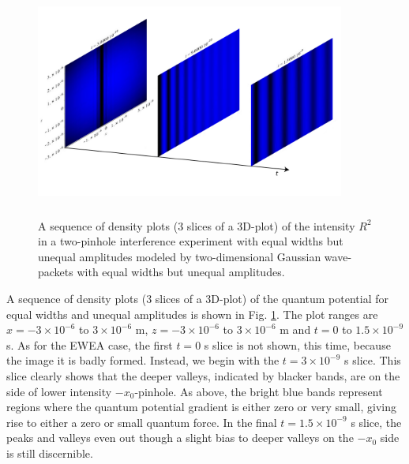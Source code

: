\documentclass[12pt]{article}       %
\begin{document}

\begin{figure}[h]
\unitlength=1in 
\hspace*{1.0in}\includegraphics[width=4in,height=3in]  {figure14.jpg} 
\caption{A sequence of density plots (3 slices of a 3D-plot) of the intensity $R^2$ in a two-pinhole interference experiment with  equal widths but unequal amplitudes modeled by two-dimensional Gaussian wave-packets with equal widths but unequal amplitudes.\label{T2DGQPDPUA}}
\end{figure}
A sequence of density plots (3 slices of a 3D-plot) of the quantum potential  for equal widths and unequal amplitudes is shown in Fig.   \ref{T2DGQPDPUA}. The plot  ranges are $x=-3\times 10^{-6}$ to $3\times 10^{-6}$ m, $z=-3\times 10^{-6}$ to $3\times 10^{-6}$ m  and $t=0$ to $1.5\times 10^{-9}$ s. As for the EWEA case, the first $t=0$ s slice is not shown, this time, because the image it is badly formed. Instead, we begin with the  $t=3\times 10^{-9}$ s slice.  This slice clearly shows that the deeper valleys, indicated by blacker bands, are on the side of lower intensity $-x_0$-pinhole. As above, the bright blue bands represent regions where the quantum potential gradient is either zero or very small,  giving rise  to either a zero or small quantum force. In the final $t=1.5\times 10^{-9}$ s slice, the peaks and  valleys even out though a slight bias to deeper valleys on the $-x_0$ side is still discernible.
\end{document}
